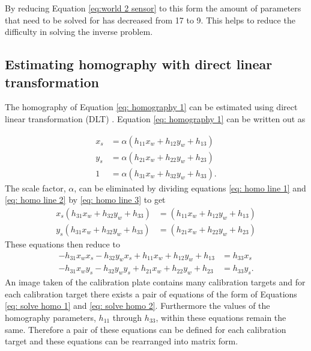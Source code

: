 \documentclass[12pt,oneside,openany,a4paper, %
english, %
masters-t, goldenblock]{usthesis}
\begin{document}
By reducing Equation \ref{eq:world 2 sensor} to this form the amount of parameters that need to be solved for has decreased from 17 to 9. This helps to reduce the difficulty in solving the inverse problem.


\subsection{Estimating homography with direct linear transformation}
The homography of Equation \ref{eq: homography 1} can be estimated using direct linear transformation (DLT) \cite{zhangtut}. Equation \ref{eq: homography 1} can be written out as

\begin{align}
  x_s &= \alpha \left( h_{11} x_w + h_{12} y_w + h_{13} \right) \label{eq: homo line 1} \\
  y_s &= \alpha \left( h_{21} x_w + h_{22} y_w + h_{23} \right) \label{eq: homo line 2} \\
  1 &= \alpha \left( h_{31} x_w + h_{32} y_w + h_{33} \right) \label{eq: homo line 3}.
\end{align}
The scale factor, $\alpha$, can be eliminated by dividing equations \ref{eq: homo line 1} and \ref{eq: homo line 2} by \ref{eq: homo line 3} to get
\begin{align}
  x_s \left( h_{31} x_w + h_{32} y_w + h_{33} \right) &= \left( h_{11} x_w + h_{12} y_w + h_{13} \right) \\
  y_s \left( h_{31} x_w + h_{32} y_w + h_{33} \right) &= \left( h_{21} x_w + h_{22} y_w + h_{23} \right)
\end{align}
These equations then reduce to
\begin{align}
  - h_{31} x_w x_s - h_{32} y_w x_s + h_{11} x_w + h_{12} y_w +h_{13} &= h_{33} x_s \label{eq: solve homo 1}\\
  - h_{31} x_w y_s - h_{32} y_w y_s + h_{21} x_w + h_{22} y_w + h_{23} &= h_{33} y_s. \label{eq: solve homo 2}
\end{align}
An image taken of the calibration plate contains many calibration targets and for each calibration target there exists a pair of equations of the form of Equations \ref{eq: solve homo 1} and \ref{eq: solve homo 2}. Furthermore the values of the homography parameters, $h_{11}$ through $h_{33}$, within these equations remain the same. Therefore a pair of these equations can be defined for each calibration target and these equations can be rearranged into matrix form.
\end{document}
